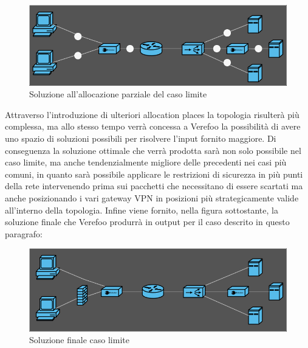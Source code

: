 \begin{figure}[h]  %
    \centering
    \includegraphics[width=1\textwidth]{CasoLimite3.png}  %
    \caption{Soluzione all'allocazione parziale del caso limite}
    \label{fig:CasoLimite3}
\end{figure}
Attraverso l'introduzione di ulteriori allocation places la topologia risulterà più complessa, ma allo stesso tempo verrà concessa a Verefoo la possibilità di avere uno spazio di soluzioni
possibili per risolvere l'input fornito maggiore. Di conseguenza la soluzione ottimale che verrà prodotta sarà non solo possibile nel caso limite, ma anche tendenzialmente migliore delle precedenti
nei casi più comuni, in quanto sarà possibile applicare le restrizioni di sicurezza in più punti della rete intervenendo prima sui pacchetti che necessitano di essere scartati ma anche posizionando 
i vari gateway VPN in posizioni più strategicamente valide all'interno della topologia. Infine viene fornito, nella figura sottostante, la soluzione finale che Verefoo produrrà in output per il caso
descrito in questo paragrafo:

\begin{figure}[h]  %
    \centering
    \includegraphics[width=1\textwidth]{CasoLimite4.png}  %
    \caption{Soluzione finale caso limite}
    \label{fig:CasoLimite4}
\end{figure}


